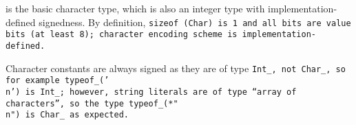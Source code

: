  is the basic character type, which is also
an integer type with implementation-defined signedness.
By definition, \tt{sizeof (Char)} is 1 and all bits are value bits (at least 8);
character encoding scheme is implementation-defined.

\note Character constants are always signed as they are of type \tt{Int_},
not \tt{Char_}, so for example \tt{typeof_('\\n')} is \tt{Int_};
however, string literals are of type ``array of characters'',
so the type \tt{typeof_(*"\\n")} is \tt{Char_} as expected.
